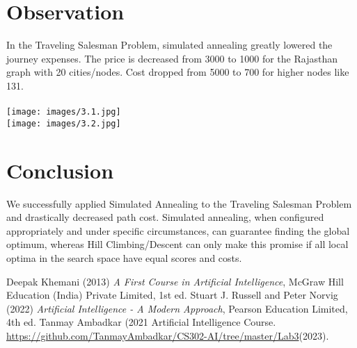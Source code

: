 \documentclass[conference]{IEEEtran}
\begin{document}
\section{Observation}
In the Traveling Salesman Problem, simulated annealing greatly lowered the journey expenses. The price is decreased from 3000 to 1000 for the Rajasthan graph with 20 cities/nodes. Cost dropped from 5000 to 700 for higher nodes like 131.\\ \\
\texttt{[image: images/3.1.jpg]}\\
\texttt{[image: images/3.2.jpg]}\\
\section{Conclusion}
We successfully applied Simulated Annealing to the Traveling Salesman Problem and drastically decreased path cost. Simulated annealing, when configured appropriately and under specific circumstances, can guarantee finding the global optimum, whereas Hill Climbing/Descent can only make this promise if all local optima in the search space have equal scores and costs.

\begin{thebibliography}{9}
\bibitem{}
Deepak Khemani (2013) \emph{A First Course in Artificial Intelligence}, McGraw Hill Education (India) Private Limited, 1st ed.
\bibitem{}
 Stuart J. Russell and Peter
Norvig (2022) \emph{Artificial Intelligence - A Modern Approach}, Pearson Education Limited, 4th ed.
\bibitem{}
Tanmay Ambadkar (2021 Artificial Intelligence Course. \href{https://github.com/TanmayAmbadkar/CS302-AI/tree/master/Lab3}{https://github.com/TanmayAmbadkar/CS302-AI/tree/master/Lab3}(2023).
\end{thebibliography}
\end{document}
